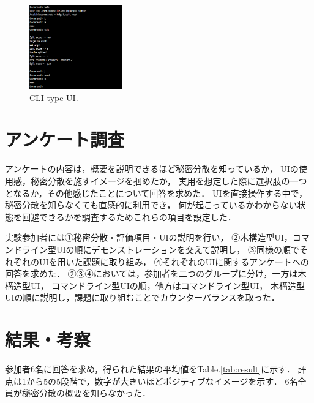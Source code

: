\documentclass[fleqn, uplatex]{jsarticle}
\begin{document}
\hspace{3mm}

\begin{figure}[htbp]
	\centering
	\includegraphics[width=40mm]{cliUI.png}
		\caption{CLI type UI.}
		\label{fig:cliUI}
\end{figure}

\section{アンケート調査}
アンケートの内容は，概要を説明できるほど秘密分散を知っているか，%
UIの使用感，秘密分散を施すイメージを掴めたか，%
実用を想定した際に選択肢の一つとなるか，その他感じたことについて回答を求めた．%
UIを直接操作する中で，秘密分散を知らなくても直感的に利用でき，%
何が起こっているかわからない状態を回避できるかを調査するためこれらの項目を設定した．%


実験参加者には①秘密分散・評価項目・UIの説明を行い，%
②木構造型UI，コマンドライン型UIの順にデモンストレーションを交えて説明し，%
③同様の順でそれぞれのUIを用いた課題に取り組み，%
④それぞれのUIに関するアンケートへの回答を求めた．%
②③④においては，参加者を二つのグループに分け，一方は木構造型UI，%
コマンドライン型UIの順，他方はコマンドライン型UI，%
木構造型UIの順に説明し，課題に取り組むことでカウンターバランスを取った．

\section{結果・考察}
参加者6名に回答を求め，得られた結果の平均値をTable.\ref{tab:result}に示す．
評点は1から5の5段階で，数字が大きいほどポジティブなイメージを示す．%
6名全員が秘密分散の概要を知らなかった．

\begin{table}[htbp]
	\centering
	\caption{Average of survey results.}
	\label{tab:result}
\end{table}
\end{document}
